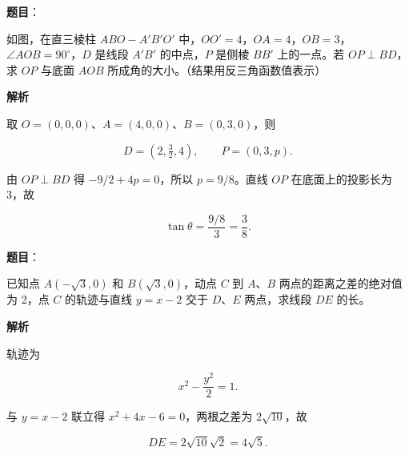 \begin{answer}

\textbf{题目}：

如图，在直三棱柱 $ABO-A'B'O'$ 中，$OO'=4$，$OA=4$，$OB=3$，$\angle AOB=90^\circ$，$D$ 是线段 $A'B'$ 的中点，$P$ 是侧棱 $BB'$ 上的一点。若 $OP\perp BD$，求 $OP$ 与底面 $AOB$ 所成角的大小。（结果用反三角函数值表示）
\nopagebreak[4]
\begin{center}\end{center}
\nopagebreak[4]
\textbf{解析}

取 $O=(0,0,0)$、$A=(4,0,0)$、$B=(0,3,0)$，则

\nopagebreak[4]
\[
D=(2,\tfrac32,4),\qquad P=(0,3,p).
\]

由 $OP\perp BD$ 得 $-9/2+4p=0$，所以 $p=9/8$。直线 $OP$ 在底面上的投影长为 3，故

\nopagebreak[4]
\[
\tan\theta=\frac{9/8}{3}=\frac38.
\]


\end{answer}
\begin{answer}

\textbf{题目}：

已知点 $A(-\sqrt3,0)$ 和 $B(\sqrt3,0)$，动点 $C$ 到 $A\text{、}B$ 两点的距离之差的绝对值为 2，点 $C$ 的轨迹与直线 $y=x-2$ 交于 $D\text{、}E$ 两点，求线段 $DE$ 的长。

\textbf{解析}

轨迹为

\nopagebreak[4]
\[
x^2-\frac{y^2}{2}=1.
\]

与 $y=x-2$ 联立得 $x^2+4x-6=0$，两根之差为 $2\sqrt{10}$，故

\nopagebreak[4]
\[
DE=2\sqrt{10}\sqrt2=4\sqrt5.
\]


\end{answer}
